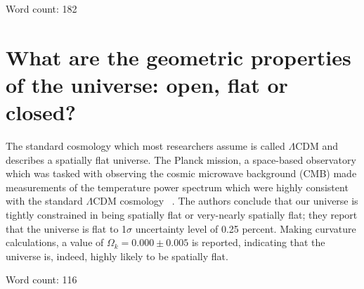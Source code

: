 \documentclass{article}
\begin{document}
Word count: 182

\section{What are the geometric properties of the universe: open, flat or closed?}

The standard cosmology which most researchers assume is called $\Lambda$CDM and describes a spatially flat universe. The Planck mission, a space-based observatory which was tasked with observing the cosmic microwave background (CMB) made measurements of the temperature power spectrum which were highly consistent with the standard $\Lambda$CDM cosmology  ~\cite{2016A&A...594A..13P}. The authors conclude that our universe is tightly constrained in being spatially flat or very-nearly spatially flat; they report that the universe is flat to 1$\sigma$ uncertainty level of 0.25 percent. Making curvature calculations, a value of $\Omega_k = 0.000 \pm{0.005}$ is reported, indicating that the universe is, indeed, highly likely to be spatially flat.

Word count: 116



\end{document}
